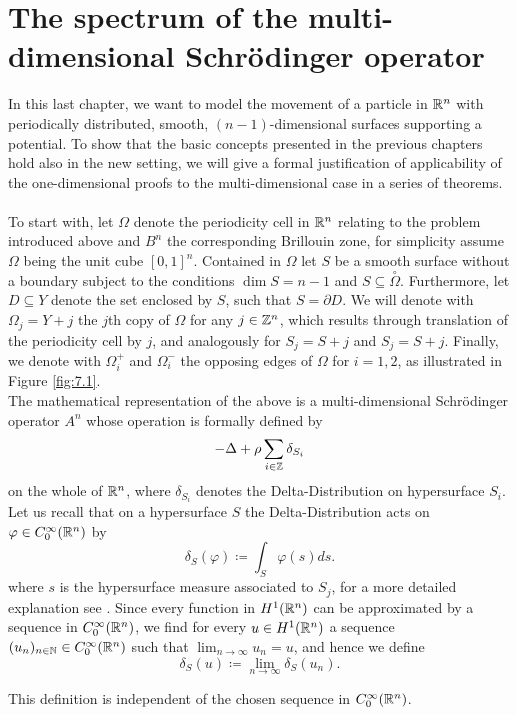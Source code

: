 \chapter{The spectrum of the multi-dimensional Schrödinger operator}  \label{chap:7} 

In this last chapter, we want to model the movement of a particle in $\mathbb{R}^{n}$ with periodically distributed, smooth, $(n-1)$-dimensional surfaces supporting a potential. To show that the basic concepts presented in the previous chapters hold also in the new setting, we will give a formal justification of applicability of the one-dimensional proofs to the multi-dimensional case in a series of theorems.
~\\

To start with, let $\Omega$ denote the periodicity cell in $\mathbb{R}^{n}$ relating to the problem introduced above and $B^{n}$ the corresponding Brillouin zone, for simplicity assume $\Omega$ being the unit cube $[0, 1]^{n}$. Contained in $\Omega$ let $S$ be a smooth surface without a boundary subject to the conditions $\dim S = n - 1$ and $S \subseteq \overset{\circ}{\Omega}$. Furthermore, let $D \subseteq Y$ denote the set enclosed by $S$, such that $S = \partial D$. We will denote with $\Omega_{j} = Y + j$ the $j$th copy of $\Omega$ for any $j \in \mathbb{Z}^{n}$, which results through translation of the periodicity cell by $j$, and analogously for $S_{j} = S + j$ and $S_{j} = S + j$. Finally, we denote with $\Omega_{i}^{+}$ and $\Omega_{i}^{-}$ the opposing edges of $\Omega$ for $i = 1, 2$, as illustrated in Figure \ref{fig:7.1}.
~\\

The mathematical representation of the above is a multi-dimensional Schrödinger operator $A^{n}$ whose operation is formally defined by
\begin{equation}
	- \Delta + \rho \sum_{i \in \mathbb{Z}} \delta_{S_{i}} \label{eq:7.1-md_the_operator_A_formallyy}
\end{equation}
on the whole of $\mathbb{R}^{n}$, where $\delta_{S_{i}}$ denotes the Delta-Distribution on hypersurface $S_{i}$. Let us recall that on a hypersurface $S$ the Delta-Distribution acts on $\varphi \in C_{0}^{\infty}(\mathbb{R}^{n})$ by 
	\[ \delta_{S}\left(\varphi\right) \coloneqq \int_{S} \varphi(s) ds . \]
where $s$ is the hypersurface measure associated to $S_{j}$, for a more detailed explanation see \cite[Chapter 14]{forster2012analysis}. Since every function in $H^{1}(\mathbb{R}^{n})$ can be approximated by a sequence in $C_{0}^{\infty}(\mathbb{R}^{n})$, we find for every $u \in H^{1}(\mathbb{R}^{n})$ a sequence $(u_{n})_{n \in \mathbb{N}} \in C_{0}^{\infty}(\mathbb{R}^{n})$ such that $\lim_{n \rightarrow \infty} u_{n} = u$, and hence we define
	\[ \delta_{S}\left(u\right) \coloneqq \lim_{n \rightarrow \infty} \delta_{S}\left(u_{n}\right) . \]
\begin{remark}
	This definition is independent of the chosen sequence in $C_{0}^{\infty}(\mathbb{R}^{n})$.
\end{remark}

